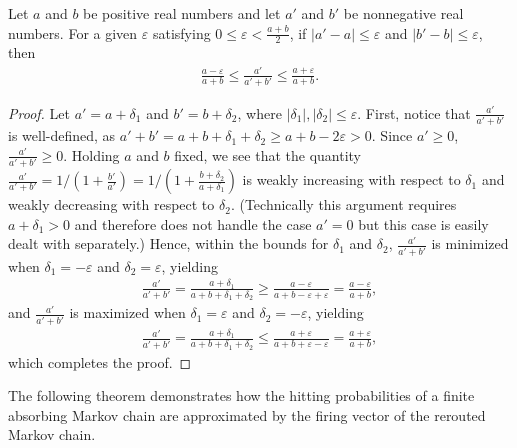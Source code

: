 \begin{lemma}\label{lemma: hitting probability absorbing helper deviation}
Let $a$ and $b$ be positive real numbers and let $a'$ and $b'$
be nonnegative real numbers.
For a given $\varepsilon$ satisfying $0 \leq \varepsilon < \frac{a+b}{2}$,
if $\left|a'-a\right|\leq \varepsilon$ and
$\left|b'-b\right| \leq \varepsilon$, then
\begin{align*}
    \frac{a-\varepsilon}{a+b} \leq \frac{a'}{a'+b'}
    \leq \frac{a+\varepsilon}{a+b}.
\end{align*}
\end{lemma}
\begin{proof}
Let $a'=a+\delta_1$ and $b'=b+\delta_2$,
where $|\delta_1|,|\delta_2| \leq \varepsilon$.
First, notice that $\frac{a'}{a'+b'}$ is well-defined,
as $a'+b' = a+b+\delta_1+\delta_2 \geq a+b-2\varepsilon > 0$.
Since $a' \geq 0$, $\frac{a'}{a'+b'}\geq 0$.
Holding $a$ and $b$ fixed, we see that the quantity 
$\frac{a'}{a'+b'} = 1/(1+\frac{b'}{a'})
= 1/(1+\frac{b+\delta_2}{a+\delta_1})$
is weakly increasing with respect to $\delta_1$
and weakly decreasing with respect to $\delta_2$.
(Technically this argument requires $a+\delta_1 > 0$
and therefore does not handle the case $a'=0$
but this case is easily dealt with separately.)
Hence, within the bounds for $\delta_1$ and $\delta_2$,
$\frac{a'}{a'+b'}$ is minimized
when $\delta_1 = -\varepsilon$ and $\delta_2 = \varepsilon$, yielding
\begin{align*}
    \frac{a'}{a'+b'}
    = \frac{a+\delta_1}{a+b+\delta_1+\delta_2}
    \geq \frac{a-\varepsilon}{a+b-\varepsilon+\varepsilon}
    = \frac{a-\varepsilon}{a+b},
\end{align*}
and $\frac{a'}{a'+b'}$ is maximized
when $\delta_1 = \varepsilon$ and $\delta_2 = -\varepsilon$, yielding
\begin{align*}
    \frac{a'}{a'+b'}
    = \frac{a+\delta_1}{a+b+\delta_1+\delta_2}
    \leq \frac{a+\varepsilon}{a+b+\varepsilon-\varepsilon}
    = \frac{a+\varepsilon}{a+b},
\end{align*}
which completes the proof.
\end{proof}

The following theorem demonstrates how 
the hitting probabilities of a finite absorbing Markov chain 
are approximated by the firing vector of the rerouted Markov chain.


